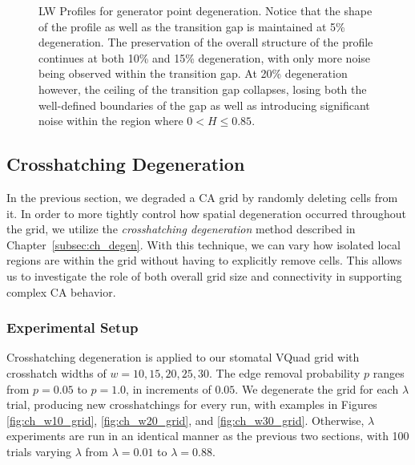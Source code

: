 \documentclass[a4paper,11pt]{article}
\begin{document}
\begin{figure}[htp]
\caption[Langton-Wootters Profile for Generator Point Degeneration]{
  LW Profiles for generator point degeneration. Notice that the shape of the profile as well as the transition gap is maintained at 5\% degeneration. The preservation of the overall structure of the profile continues at both 10\% and 15\% degeneration, with only more noise being observed within the transition gap. At 20\% degeneration however, the ceiling of the transition gap collapses, losing both the well-defined boundaries of the gap as well as introducing significant noise within the region where $0 < H \le 0.85$.
}
\label{fig:lw_gen_pt_degen}
\end{figure}

\subsection{Crosshatching Degeneration}

In the previous section, we degraded a CA grid by randomly deleting cells from it. In order to more tightly control how spatial degeneration occurred throughout the grid, we utilize the \textit{crosshatching degeneration} method described in Chapter~\ref{subsec:ch_degen}. With this technique, we can vary how isolated local regions are within the grid without having to explicitly remove cells. This allows us to investigate the role of both overall grid size and connectivity in supporting complex CA behavior.

\subsubsection*{Experimental Setup}
Crosshatching degeneration is applied to our stomatal VQuad grid with crosshatch widths of $w=10,15,20,25,30$. The edge removal probability $p$ ranges from $p=0.05$ to $p=1.0$, in increments of $0.05$. We degenerate the grid for each $\lambda$ trial, producing new crosshatchings for every run, with examples in Figures \ref{fig:ch_w10_grid}, \ref{fig:ch_w20_grid}, and \ref{fig:ch_w30_grid}. Otherwise, $\lambda$ experiments are run in an identical manner as the previous two sections, with 100 trials varying $\lambda$ from $\lambda=0.01$ to $\lambda=0.88$.
\end{document}
